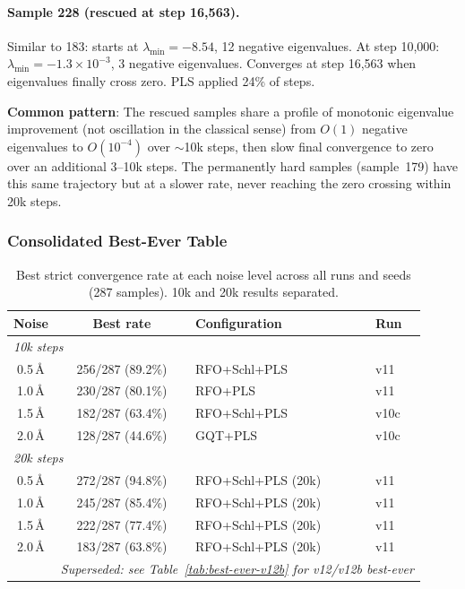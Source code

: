 \documentclass[11pt,a4paper]{article}
\theoremstyle{definition}
\begin{document}
\paragraph{Sample 228 (rescued at step 16{,}563).}
Similar to 183: starts at $\lambda_\text{min}=-8.54$, 12 negative eigenvalues.
At step 10{,}000: $\lambda_\text{min}=-1.3\times10^{-3}$, 3 negative
eigenvalues.  Converges at step 16{,}563 when eigenvalues finally cross zero.
PLS applied 24\% of steps.

\textbf{Common pattern}: The rescued samples share a profile of monotonic
eigenvalue improvement (not oscillation in the classical sense) from
$O(1)$ negative eigenvalues to $O(10^{-4})$ over $\sim$10k steps, then
slow final convergence to zero over an additional 3--10k steps.  The
permanently hard samples (sample~179) have this same trajectory but at a
slower rate, never reaching the zero crossing within 20k steps.

\subsubsection{Consolidated Best-Ever Table}
\label{sec:best-ever}

\begin{table}[h]
\centering
\caption{Best strict convergence rate at each noise level across all runs
  and seeds (287 samples).  10k and 20k results separated.}
\label{tab:best-ever}
\begin{tabular}{ccll}
\toprule
Noise & Best rate & Configuration & Run \\
\midrule
\multicolumn{4}{l}{\emph{10k steps}} \\
0.5\,\AA & 256/287 (89.2\%) & RFO+Schl+PLS       & v11 \\
1.0\,\AA & 230/287 (80.1\%) & RFO+PLS             & v11 \\
1.5\,\AA & 182/287 (63.4\%) & RFO+Schl+PLS        & v10c \\
2.0\,\AA & 128/287 (44.6\%) & GQT+PLS             & v10c \\
\midrule
\multicolumn{4}{l}{\emph{20k steps}} \\
0.5\,\AA & 272/287 (94.8\%) & RFO+Schl+PLS (20k)  & v11 \\
1.0\,\AA & 245/287 (85.4\%) & RFO+Schl+PLS (20k)  & v11 \\
1.5\,\AA & 222/287 (77.4\%) & RFO+Schl+PLS (20k)  & v11 \\
2.0\,\AA & 183/287 (63.8\%) & RFO+Schl+PLS (20k)  & v11 \\
       & \multicolumn{3}{l}{\emph{Superseded: see Table~\ref{tab:best-ever-v12b} for v12/v12b best-ever}} \\
\bottomrule
\end{tabular}
\end{table}
\end{document}
